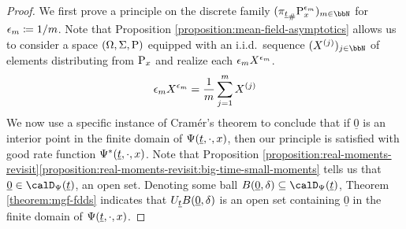 \begin{proof}
  We first prove a principle on the discrete family $(\push{\Prb^{\epsilon_m}_\stateVar}{\pi_{\underline t}})_{m\in\bbN}$ for $\epsilon_m \coloneqq 1/m$.
  Note that Proposition \ref{proposition:mean-field-asymptotics} allows us to consider a space $(\Omega, \Sigma, {\operatorname{P}})$ equipped with an i.i.d.\ sequence $(\X^{(j)})_{j\in\bbN}$ of elements distributing from ${\operatorname{P}}_x$ and realize each $\epsilon_m X^{\epsilon_m}$.
  \begin{equation*}
    \epsilon_m X^{\epsilon_m} = \frac1m\sum_{j=1}^m X^{(j)}
  \end{equation*}
  We now use a specific instance of Cram\'er's theorem \cite[Corollary 6.1.6]{dembo2010} to conclude that if $\underline 0$ is an interior point in the finite domain of $\Psi(\underline t, \cdot, x)$, then our principle is satisfied with good rate function $\Psi^*(\underline t, \cdot, x)$.
  Note that Proposition \ref{proposition:real-moments-revisit}\ref{proposition:real-moments-revisit:big-time-small-moments} tells us that $\underline0 \in \momentSpace(\underline t)$, an open set.
  Denoting some ball $\ball{\underline0}{\delta} \subseteq \momentSpace(\underline t)$, Theorem \ref{theorem:mgf-fdds} indicates that $U_{\underline t}{B(\underline 0,\delta)}$ is an open set containing $\underline0$ in the finite domain of $\Psi(\underline t, \cdot, x)$.


\end{proof}
